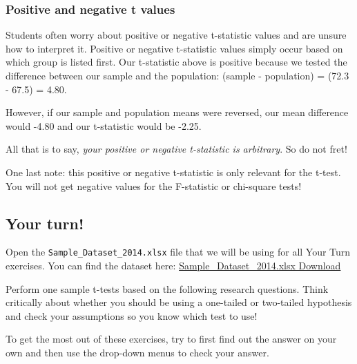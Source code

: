 \documentclass[
]{book}
\begin{document}
\hypertarget{positive-and-negative-t-values}{%
\subsubsection{Positive and negative t values}\label{positive-and-negative-t-values}}

Students often worry about positive or negative t-statistic values and are unsure how to interpret it. Positive or negative t-statistic values simply occur based on which group is listed first. Our t-statistic above is positive because we tested the difference between our sample and the population: (sample - population) = (72.3 - 67.5) = 4.80.

However, if our sample and population means were reversed, our mean difference would -4.80 and our t-statistic would be -2.25.

All that is to say, \emph{your positive or negative t-statistic is arbitrary}. So do not fret!

One last note: this positive or negative t-statistic is only relevant for the t-test. You will not get negative values for the F-statistic or chi-square tests!

\hypertarget{your-turn}{%
\subsection{Your turn!}\label{your-turn}}

Open the \texttt{Sample\_Dataset\_2014.xlsx} file that we will be using for all Your Turn exercises. You can find the dataset here: \href{https://github.com/danawanzer/stats-with-jamovi/blob/master/data/Sample_Dataset_2014.xlsx}{Sample\_Dataset\_2014.xlsx Download}

Perform one sample t-tests based on the following research questions. Think critically about whether you should be using a one-tailed or two-tailed hypothesis and check your assumptions so you know which test to use!

To get the most out of these exercises, try to first find out the answer on your own and then use the drop-down menus to check your answer.
\end{document}
